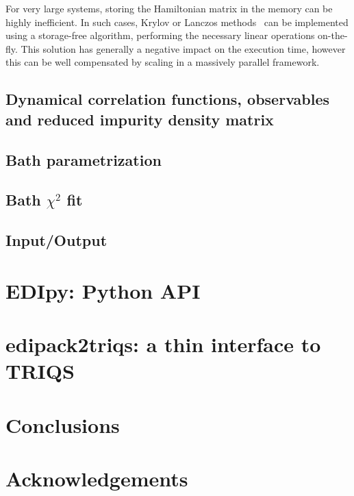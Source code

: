\documentclass[final,3p,10pt]{elsarticle}
\begin{document}
For very large systems, storing the Hamiltonian matrix in the memory
can be highly inefficient.
In such cases, Krylov or Lanczos
methods~\cite{Lanczos1950JRNBSB,Lin1993CIP,Lehoucq1998,Maschhoff1996} can
be implemented using a storage-free algorithm, performing the
necessary linear operations on-the-fly.
This solution has generally a negative impact on the execution
time, however this can be well compensated by scaling in a massively
parallel framework.

\subsection{Dynamical correlation functions, observables and reduced
  impurity density matrix}

\subsection{Bath parametrization}

\subsection{Bath $\chi^2$ fit}


\subsection{Input/Output}



\section{EDIpy: Python API}\label{SecEDIpy}


\section{edipack2triqs: a thin interface to TRIQS}\label{Secedi2triqs}



\section{Conclusions}


\section*{Acknowledgements}
\end{document}
